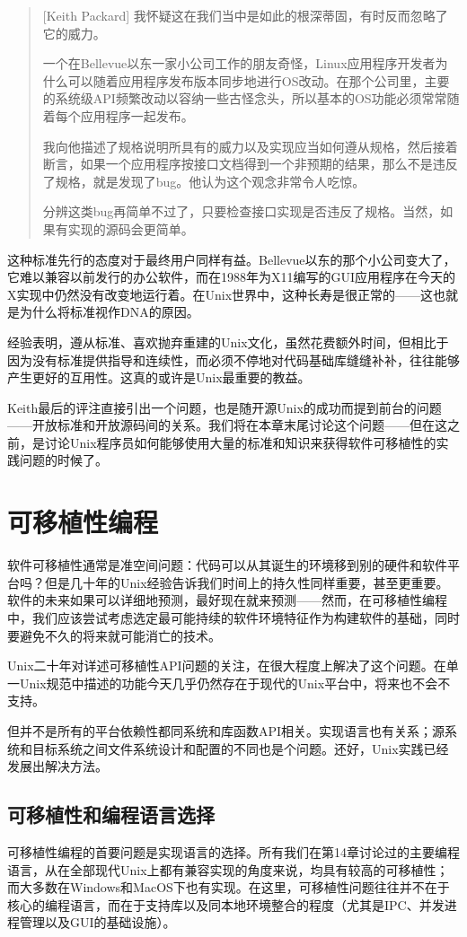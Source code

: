 \documentclass[12pt,oneside]{ctexbook}
\begin{document}
\begin{common-format}
\begin{quote}[Keith Packard]
我怀疑这在我们当中是如此的根深蒂固，有时反而忽略了它的威力。

一个在Bellevue以东一家小公司工作的朋友奇怪，Linux应用程序开发者为什么可以随着应用程序发布版本同步地进行OS改动。在那个公司里，主要的系统级API频繁改动以容纳一些古怪念头，所以基本的OS功能必须常常随着每个应用程序一起发布。

我向他描述了规格说明所具有的威力以及实现应当如何遵从规格，然后接着断言，如果一个应用程序按接口文档得到一个非预期的结果，那么不是违反了规格，就是发现了bug。他认为这个观念非常令人吃惊。

分辨这类bug再简单不过了，只要检查接口实现是否违反了规格。当然，如果有实现的源码会更简单。
\end{quote}

这种标准先行的态度对于最终用户同样有益。Bellevue以东的那个小公司变大了，它难以兼容以前发行的办公软件，而在1988年为X11编写的GUI应用程序在今天的X实现中仍然没有改变地运行着。在Unix世界中，这种长寿是很正常的——这也就是为什么将标准视作DNA的原因。

经验表明，遵从标准、喜欢抛弃重建的Unix文化，虽然花费额外时间，但相比于因为没有标准提供指导和连续性，而必须不停地对代码基础库缝缝补补，往往能够产生更好的互用性。这真的或许是Unix最重要的教益。

Keith最后的评注直接引出一个问题，也是随开源Unix的成功而提到前台的问题——开放标准和开放源码间的关系。我们将在本章末尾讨论这个问题——但在这之前，是讨论Unix程序员如何能够使用大量的标准和知识来获得软件可移植性的实践问题的时候了。

\section{可移植性编程}
软件可移植性通常是准空间问题：代码可以从其诞生的环境移到别的硬件和软件平台吗？但是几十年的Unix经验告诉我们时间上的持久性同样重要，甚至更重要。软件的未来如果可以详细地预测，最好现在就来预测——然而，在可移植性编程中，我们应该尝试考虑选定最可能持续的软件环境特征作为构建软件的基础，同时要避免不久的将来就可能消亡的技术。

Unix二十年对详述可移植性API问题的关注，在很大程度上解决了这个问题。在单一Unix规范中描述的功能今天几乎仍然存在于现代的Unix平台中，将来也不会不支持。

但并不是所有的平台依赖性都同系统和库函数API相关。实现语言也有关系；源系统和目标系统之间文件系统设计和配置的不同也是个问题。还好，Unix实践已经发展出解决方法。

\subsection{可移植性和编程语言选择}
可移植性编程的首要问题是实现语言的选择。所有我们在第14章讨论过的主要编程语言，从在全部现代Unix上都有兼容实现的角度来说，均具有较高的可移植性；而大多数在Windows和MacOS下也有实现。在这里，可移植性问题往往并不在于核心的编程语言，而在于支持库以及同本地环境整合的程度（尤其是IPC、并发进程管理以及GUI的基础设施）。


\end{common-format}
\end{document}
